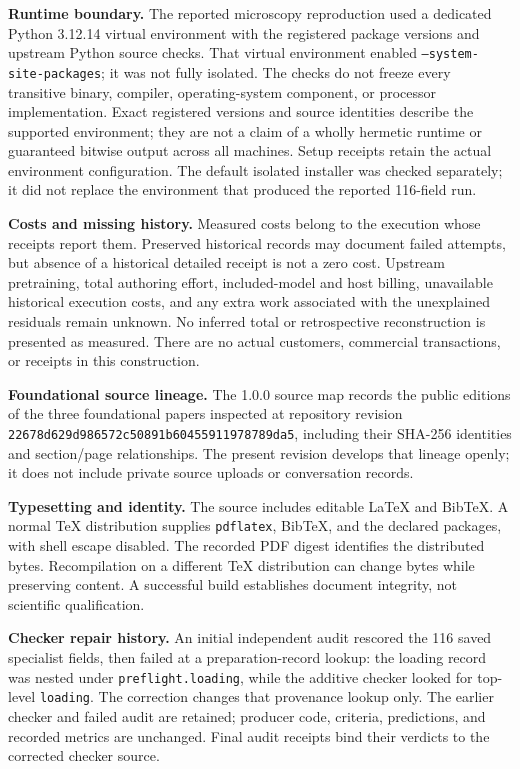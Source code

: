 \textbf{Runtime boundary.} The reported microscopy reproduction used a dedicated Python 3.12.14 virtual environment with the registered package versions and upstream Python source checks. That virtual environment enabled \texttt{--system-site-packages}; it was not fully isolated. The checks do not freeze every transitive binary, compiler, operating-system component, or processor implementation. Exact registered versions and source identities describe the supported environment; they are not a claim of a wholly hermetic runtime or guaranteed bitwise output across all machines. Setup receipts retain the actual environment configuration. The default isolated installer was checked separately; it did not replace the environment that produced the reported 116-field run.

\textbf{Costs and missing history.} Measured costs belong to the execution whose receipts report them. Preserved historical records may document failed attempts, but absence of a historical detailed receipt is not a zero cost. Upstream pretraining, total authoring effort, included-model and host billing, unavailable historical execution costs, and any extra work associated with the unexplained residuals remain unknown. No inferred total or retrospective reconstruction is presented as measured. There are no actual customers, commercial transactions, or receipts in this construction.

\textbf{Foundational source lineage.} The 1.0.0 source map records the public editions of the three foundational papers inspected at repository revision \texttt{22678d629d986572c50891b60455911978789da5}, including their SHA-256 identities and section/page relationships. The present revision develops that lineage openly; it does not include private source uploads or conversation records.

\textbf{Typesetting and identity.} The source includes editable \LaTeX{} and BibTeX. A normal TeX distribution supplies \texttt{pdflatex}, BibTeX, and the declared packages, with shell escape disabled. The recorded PDF digest identifies the distributed bytes. Recompilation on a different TeX distribution can change bytes while preserving content. A successful build establishes document integrity, not scientific qualification.

\textbf{Checker repair history.} An initial independent audit rescored the 116 saved specialist fields, then failed at a preparation-record lookup: the loading record was nested under \texttt{preflight.loading}, while the additive checker looked for top-level \texttt{loading}. The correction changes that provenance lookup only. The earlier checker and failed audit are retained; producer code, criteria, predictions, and recorded metrics are unchanged. Final audit receipts bind their verdicts to the corrected checker source.

